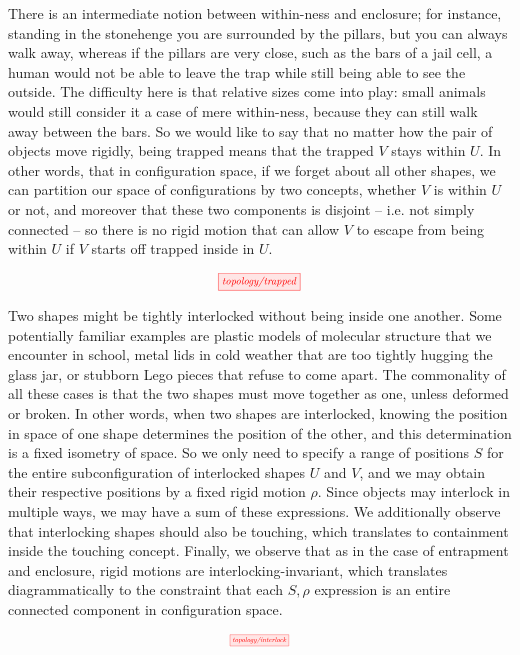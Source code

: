 There is an intermediate notion between within-ness and enclosure; for instance, standing in the stonehenge you are surrounded by the pillars, but you can always walk away, whereas if the pillars are very close, such as the bars of a jail cell, a human would not be able to leave the trap while still being able to see the outside. The difficulty here is that relative sizes come into play: small animals would still consider it a case of mere within-ness, because they can still walk away between the bars. So we would like to say that no matter how the pair of objects move rigidly, being trapped means that the trapped $V$ stays within $U$. In other words, that in configuration space, if we forget about all other shapes, we can partition our space of configurations by two concepts, whether $V$ is within $U$ or not, and moreover that these two components is disjoint -- i.e. not simply connected -- so there is no rigid motion that can allow $V$ to escape from being within $U$ if $V$ starts off trapped inside in $U$.

\[\scalebox{0.75}{\tikzfig{topology/trapped}}\]


Two shapes might be tightly interlocked without being inside one another. Some potentially familiar examples are plastic models of molecular structure that we encounter in school, metal lids in cold weather that are too tightly hugging the glass jar, or stubborn Lego pieces that refuse to come apart. The commonality of all these cases is that the two shapes must move together as one, unless deformed or broken. In other words, when two shapes are interlocked, knowing the position in space of one shape determines the position of the other, and this determination is a fixed isometry of space. So we only need to specify a range of positions $S$ for the entire subconfiguration of interlocked shapes $U$ and $V$, and we may obtain their respective positions by a fixed rigid motion $\rho$. Since objects may interlock in multiple ways, we may have a sum of these expressions. We additionally observe that interlocking shapes should also be touching, which translates to containment inside the touching concept. Finally, we observe that as in the case of entrapment and enclosure, rigid motions are interlocking-invariant, which translates diagrammatically to the constraint that each $S,\rho$ expression is an entire connected component in configuration space.

\[\scalebox{0.5}{\tikzfig{topology/interlock}}\]

